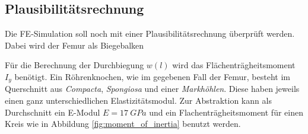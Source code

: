 	\subsection{Plausibilitätsrechnung}
		Die FE-Simulation soll noch mit einer Plausibilitätsrechnung überprüft werden. Dabei wird der Femur als
		Biegebalken 
		
		Für die Berechnung der Durchbiegung $w\left(l\right)$ wird das Flächenträgheitsmoment $I_{y}$ benötigt.
		Ein Röhrenknochen, wie im gegebenen Fall der Femur, besteht im Querschnitt aus \textit{Compacta},
		\textit{Spongiosa} und einer \textit{Markhöhlen}. Diese haben jeweils einen ganz unterschiedlichen
		Elastizitätsmodul. Zur Abstraktion kann als Durchschnitt ein E-Modul $ E = \SI{17}{GPa} $ und ein
		Flachenträgheitsmoment für einen Kreis wie in Abbildung \ref{fig:moment_of_inertia} benutzt werden.
		
